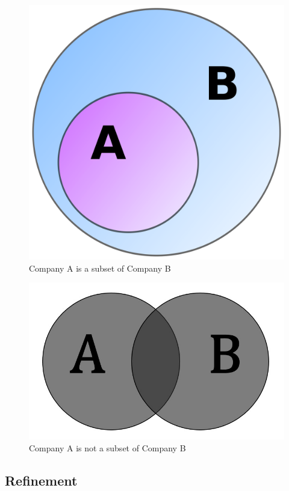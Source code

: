 \documentclass[oneside]{article}
\begin{document}
\begin{figure}[h!]
\centering
\includegraphics[scale=0.05]{img/venn_a_subset_b.png}
\caption{Company A is a subset of Company B}
\label{fig:venn_a_subset_b}
\end{figure}

\begin{figure}[h!]
\centering
\includegraphics[scale=0.1]{img/venn_a_and_b.jpg}
\caption{Company A is not a subset of Company B}
\label{fig:venn_a_and_b}
\end{figure}

\subsection{Refinement}
\end{document}
